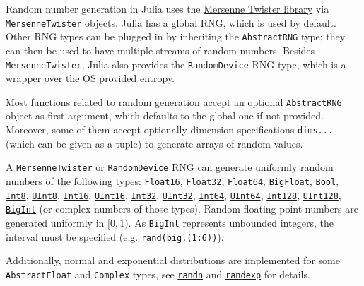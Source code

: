 Random number generation in Julia uses the \href{http://www.math.sci.hiroshima-u.ac.jp/{\textasciitilde}m-mat/MT/SFMT/\#dSFMT}{Mersenne Twister library} via \texttt{MersenneTwister} objects. Julia has a global RNG, which is used by default. Other RNG types can be plugged in by inheriting the \texttt{AbstractRNG} type; they can then be used to have multiple streams of random numbers. Besides \texttt{MersenneTwister}, Julia also provides the \texttt{RandomDevice} RNG type, which is a wrapper over the OS provided entropy.



Most functions related to random generation accept an optional \texttt{AbstractRNG} object as first argument, which defaults to the global one if not provided. Moreover, some of them accept optionally dimension specifications \texttt{dims...} (which can be given as a tuple) to generate arrays of random values.



A \texttt{MersenneTwister} or \texttt{RandomDevice} RNG can generate uniformly random numbers of the following types: \hyperlink{2727296760866702904}{\texttt{Float16}}, \hyperlink{8101639384272933082}{\texttt{Float32}}, \hyperlink{5027751419500983000}{\texttt{Float64}}, \hyperlink{749816618809421837}{\texttt{BigFloat}}, \hyperlink{46725311238864537}{\texttt{Bool}}, \hyperlink{5857518405103968275}{\texttt{Int8}}, \hyperlink{6609065134969660118}{\texttt{UInt8}}, \hyperlink{6667287249103968645}{\texttt{Int16}}, \hyperlink{7018610346698168012}{\texttt{UInt16}}, \hyperlink{10103694114785108551}{\texttt{Int32}}, \hyperlink{8690996847580776341}{\texttt{UInt32}}, \hyperlink{7720564657383125058}{\texttt{Int64}}, \hyperlink{5500998675195555601}{\texttt{UInt64}}, \hyperlink{8012327724714767060}{\texttt{Int128}}, \hyperlink{14811222188335428522}{\texttt{UInt128}}, \hyperlink{423405808990690832}{\texttt{BigInt}} (or complex numbers of those types). Random floating point numbers are generated uniformly in \([0, 1)\). As \texttt{BigInt} represents unbounded integers, the interval must be specified (e.g. \texttt{rand(big.(1:6))}).



Additionally, normal and exponential distributions are implemented for some \texttt{AbstractFloat} and \texttt{Complex} types, see \hyperlink{7347069443766288058}{\texttt{randn}} and \hyperlink{17131026676213441996}{\texttt{randexp}} for details.



\hypertarget{4356963021367801788}{}


